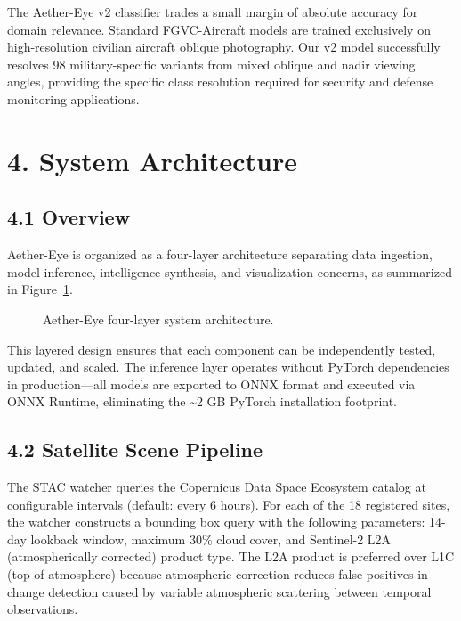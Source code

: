 \documentclass[11pt,a4paper]{article}
\begin{document}
The Aether-Eye v2 classifier trades a small margin of absolute accuracy for domain relevance. Standard FGVC-Aircraft models are trained exclusively on high-resolution civilian aircraft oblique photography. Our v2 model successfully resolves 98 military-specific variants from mixed oblique and nadir viewing angles, providing the specific class resolution required for security and defense monitoring applications.

\hypertarget{system-architecture}{%
\section{4. System Architecture}\label{system-architecture}}

\hypertarget{overview}{%
\subsection{4.1 Overview}\label{overview}}

Aether-Eye is organized as a four-layer architecture separating data ingestion, model inference, intelligence synthesis, and visualization concerns, as summarized in Figure~\ref{fig:architecture}.

\begin{figure}[t]
\centering
\resizebox{\columnwidth}{!}{}
\caption{Aether-Eye four-layer system architecture.}
\label{fig:architecture}
\end{figure}

This layered design ensures that each component can be independently tested, updated, and scaled. The inference layer operates without PyTorch dependencies in production---all models are exported to ONNX format and executed via ONNX Runtime, eliminating the \textasciitilde2 GB PyTorch installation footprint.

\hypertarget{satellite-scene-pipeline}{%
\subsection{4.2 Satellite Scene Pipeline}\label{satellite-scene-pipeline}}

The STAC watcher queries the Copernicus Data Space Ecosystem catalog at configurable intervals (default: every 6 hours). For each of the 18 registered sites, the watcher constructs a bounding box query with the following parameters: 14-day lookback window, maximum 30\% cloud cover, and Sentinel-2 L2A (atmospherically corrected) product type. The L2A product is preferred over L1C (top-of-atmosphere) because atmospheric correction reduces false positives in change detection caused by variable atmospheric scattering between temporal observations.
\end{document}
